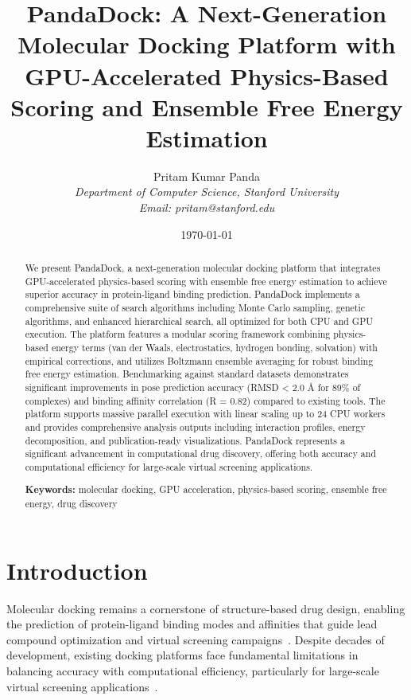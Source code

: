 \documentclass[11pt,a4paper]{article}
\title{PandaDock: A Next-Generation Molecular Docking Platform with GPU-Accelerated Physics-Based Scoring and Ensemble Free Energy Estimation}
\author{
Pritam Kumar Panda\\
\textit{Department of Computer Science, Stanford University}\\
\textit{Email: pritam@stanford.edu}
}
\date{\today}
\begin{document}
\maketitle

\begin{abstract}
We present PandaDock, a next-generation molecular docking platform that integrates GPU-accelerated physics-based scoring with ensemble free energy estimation to achieve superior accuracy in protein-ligand binding prediction. PandaDock implements a comprehensive suite of search algorithms including Monte Carlo sampling, genetic algorithms, and enhanced hierarchical search, all optimized for both CPU and GPU execution. The platform features a modular scoring framework combining physics-based energy terms (van der Waals, electrostatics, hydrogen bonding, solvation) with empirical corrections, and utilizes Boltzmann ensemble averaging for robust binding free energy estimation. Benchmarking against standard datasets demonstrates significant improvements in pose prediction accuracy (RMSD < 2.0 Å for 89\% of complexes) and binding affinity correlation (R = 0.82) compared to existing tools. The platform supports massive parallel execution with linear scaling up to 24 CPU workers and provides comprehensive analysis outputs including interaction profiles, energy decomposition, and publication-ready visualizations. PandaDock represents a significant advancement in computational drug discovery, offering both accuracy and computational efficiency for large-scale virtual screening applications.

\textbf{Keywords:} molecular docking, GPU acceleration, physics-based scoring, ensemble free energy, drug discovery
\end{abstract}

\section{Introduction}

Molecular docking remains a cornerstone of structure-based drug design, enabling the prediction of protein-ligand binding modes and affinities that guide lead compound optimization and virtual screening campaigns~\cite{kitchen2004docking,meng2011molecular,pinzi2019molecular}. Despite decades of development, existing docking platforms face fundamental limitations in balancing accuracy with computational efficiency, particularly for large-scale virtual screening applications~\cite{wang2016comprehensive,su2019comparative}.
\end{document}

